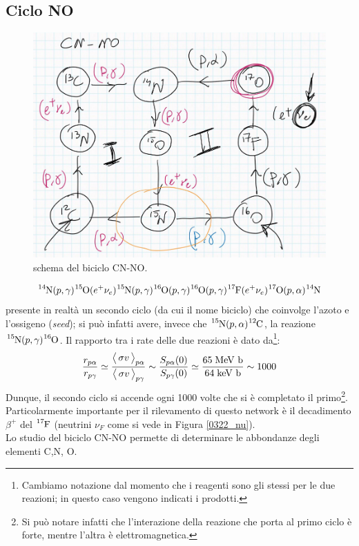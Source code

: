 \subsection{Ciclo NO}
\begin{figure}[!h]
	\centering
	\includegraphics[scale=0.5]{Immagini/0422_biCNNOscheme.png}
	\caption{schema del biciclo CN-NO.}
	\label{0422_NO}
\end{figure}
$$\ce{^{14}N}(p,\gamma)\ce{^{15}O}(e^+\nu_e)\ce{^{15}N}(p,\gamma)\ce{^{16}O}(p,\gamma)\ce{^{16}O}(p,\gamma)\ce{^{17}F}(e^+\nu_e)\ce{^{17}O}(p,\alpha)\ce{^{14}N}$$
 presente in realtà un secondo ciclo (da cui il nome biciclo) che coinvolge l'azoto e l'ossigeno (\textit{seed}); si può infatti avere, invece che $\ce{^{15}N}(p,\alpha)\ce{^{12}C}$, la reazione $\ce{^{15}N}(p,\gamma)\ce{^{16}O}$. Il rapporto tra i rate delle due reazioni è dato da\footnote{Cambiamo notazione dal momento che i reagenti sono gli stessi per le due reazioni; in questo caso vengono indicati i prodotti.}:
$$\frac{r_{p\alpha}}{r_{p\gamma}}\simeq \frac{\bigl\langle\, \sigma v\, \bigr\rangle_{p\alpha}}{\bigl\langle\, \sigma v\, \bigr\rangle_{p\gamma}}\sim\frac{S_{p\alpha}(0)}{S_{p\gamma}(0)}\simeq \frac{65\;\mbox{MeV b}}{64\;\mbox{keV b}}\sim 1000$$
Dunque, il secondo ciclo si accende ogni 1000 volte che si è completato il primo\footnote{Si può notare infatti che l'interazione della reazione che porta al primo ciclo è forte, mentre l'altra è elettromagnetica.}. Particolarmente importante per il rilevamento di questo network è il decadimento $\beta^+$ del $\ce{^{17}F}$ (neutrini $\nu_F$ come si vede in Figura \ref{0322_nu}).\\ 
Lo studio del biciclo CN-NO permette di determinare le abbondanze degli elementi C,N, O. 

